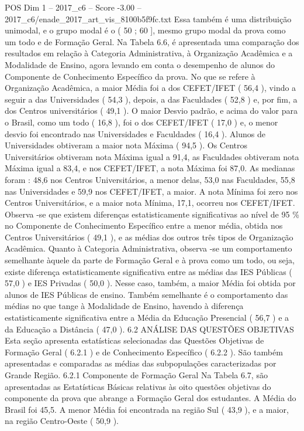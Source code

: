 \begin{textsample}{POS Dim 1 – 2017\_c6 – Score -3.00 – 2017\_c6/enade\_2017\_art\_vis\_8100b5f9fc.txt}
Essa também é uma distribuição unimodal, e o grupo modal é o ( 50 ; 60 ], mesmo grupo modal da prova como um todo e de Formação Geral.
Na Tabela 6.6, é apresentada uma comparação dos resultados em relação à Categoria Administrativa, à Organização Acadêmica e a Modalidade de Ensino, agora levando em conta o desempenho de alunos do Componente de Conhecimento Específico da prova.
No que se refere à Organização Acadêmica, a maior Média foi a dos CEFET/IFET ( 56,4 ), vindo a seguir a das Universidades ( 54,3 ), depois, a das Faculdades ( 52,8 ) e, por fim, a dos Centros universitários ( 49,1 ).
O maior Desvio padrão, e acima do valor para o Brasil, como um todo ( 16,8 ), foi o dos CEFET/IFET ( 17,0 ) e, o menor desvio foi encontrado nas Universidades e Faculdades ( 16,4 ).
Alunos de Universidades obtiveram a maior nota Máxima ( 94,5 ).
Os Centros Universitários obtiveram nota Máxima igual a 91,4, as Faculdades obtiveram nota Máxima igual a 83,4, e nos CEFET/IFET, a nota Máxima foi 87,0.
As medianas foram : 48,6 nos Centros Universitários, a menor delas, 53,0 nas Faculdades, 55,8 nas Universidades e 59,9 nos CEFET/IFET, a maior.
A nota Mínima foi zero nos Centros Universitários, e a maior nota Mínima, 17,1, ocorreu nos CEFET/IFET.
Observa -se que existem diferenças estatisticamente significativas ao nível de 95 \% no Componente de Conhecimento Específico entre a menor média, obtida nos Centros Universitários ( 49,1 ), e as médias dos outros três tipos de Organização Acadêmica.
Quanto à Categoria Administrativa, observa -se um comportamento semelhante àquele da parte de Formação Geral e à prova como um todo, ou seja, existe diferença estatisticamente significativa entre as médias das IES Públicas ( 57,0 ) e IES Privadas ( 50,0 ).
Nesse caso, também, a maior Média foi obtida por alunos de IES Públicas de ensino.
Também semelhante é o comportamento das médias no que tange à Modalidade de Ensino, havendo à diferença estatisticamente significativa entre a Média da Educação Presencial ( 56,7 ) e a da Educação a Distância ( 47,0 ). 6.2 ANÁLISE DAS QUESTÕES OBJETIVAS Esta seção apresenta estatísticas selecionadas das Questões Objetivas de Formação Geral ( 6.2.1 ) e de Conhecimento Específico ( 6.2.2 ).
São também apresentadas e comparadas as médias das subpopulações caracterizadas por Grande Região. 6.2.1 Componente de Formação Geral Na Tabela 6.7, são apresentadas as Estatísticas Básicas relativas às oito questões objetivas do componente da prova que abrange a Formação Geral dos estudantes.
A Média do Brasil foi 45,5.
A menor Média foi encontrada na região Sul ( 43,9 ), e a maior, na região Centro-Oeste ( 50,9 ).

\end{textsample}
